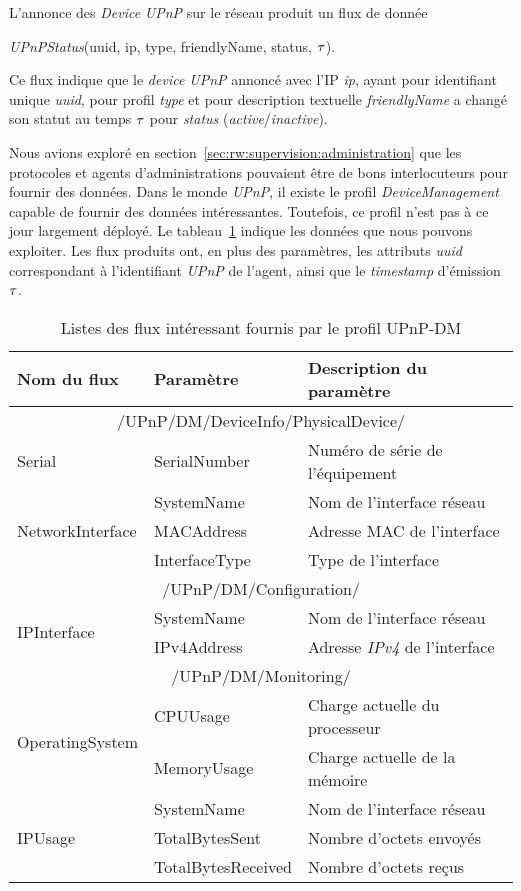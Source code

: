 L'annonce des \textit{Device} \textit{UPnP} sur le réseau produit un flux de donnée \begin{center}\textit{UPnPStatus}(uuid, ip, type, friendlyName, status, $\tau$).\end{center} Ce flux indique que le \textit{device UPnP} annoncé avec l'IP \textit{ip}, ayant pour identifiant unique \textit{uuid}, pour profil \textit{type} et pour description textuelle \textit{friendlyName} a changé son statut au temps $\tau$ pour \textit{status} (\textit{active}/\textit{inactive}).

Nous avions exploré en section~\ref{sec:rw:supervision:administration} que les protocoles et agents d'administrations pouvaient être de bons interlocuteurs pour fournir des données. Dans le monde \textit{UPnP}, il existe le profil \textit{DeviceManagement} capable de fournir des données intéressantes. Toutefois, ce profil n'est pas à ce jour largement déployé. Le tableau~\ref{tab:valid:domvision:upnpdm} indique les données que nous pouvons exploiter. Les flux produits ont, en plus des paramètres, les attributs \textit{uuid} correspondant à l'identifiant \textit{UPnP} de l'agent, ainsi que le \textit{timestamp} d'émission $\tau$.

\begin{table}[ht]
\centering
\begin{tabular}{|m{}|>{\ttfamily}m{}|m{}|} \bottomrule
\rowcolor{hypcolor} Nom du flux & \rm Paramètre & Description du paramètre\\ \hline
\multicolumn{3}{|c|}{/UPnP/DM/DeviceInfo/PhysicalDevice/} \\\hline
Serial & {SerialNumber} & Numéro de série de l'équipement\\\hline
\multirow{3}{*}{NetworkInterface} & {SystemName} & Nom de l'interface réseau\\\cline{2-3}
& {MACAddress} & Adresse MAC de l'interface\\\cline{2-3}
& InterfaceType & Type de l'interface \\\hline
\multicolumn{3}{|c|}{/UPnP/DM/Configuration/} \\\hline
\multirow{2}{*}{IPInterface} & SystemName & Nom de l'interface réseau \\\cline{2-3}
& IPv4Address & Adresse \textit{IPv4} de l'interface \\ \hline
\multicolumn{3}{|c|}{/UPnP/DM/Monitoring/} \\\hline
\multirow{2}{*}{OperatingSystem} & CPUUsage & Charge actuelle du processeur\\\cline{2-3}
& MemoryUsage & Charge actuelle de la mémoire\\ \hline
\multirow{3}{*}{IPUsage} & SystemName & Nom de l'interface réseau\\ \cline{2-3}
& TotalBytesSent & Nombre d'octets envoyés \\\cline{2-3}
& TotalBytesReceived & Nombre d'octets reçus \\ \toprule
\end{tabular}
\caption{Listes des flux intéressant fournis par le profil UPnP-DM}\label{tab:valid:domvision:upnpdm}
\end{table}

